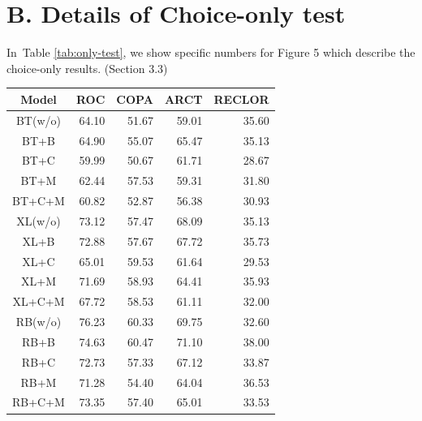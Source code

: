 \documentclass[letterpaper]{article} %
\newcommand{\secref}[1]{Section \ref{#1}}
\newcommand{\tabref}[1]{Table \ref{#1}}
\begin{document}
\section{B.   Details of Choice-only test}
In~\tabref{tab:only-test}, we show specific numbers for Figure 5 which describe 
the choice-only results. (Section 3.3)
\begin{table}[th]
\centering
\scriptsize
\begin{tabular}{c|rrrr}
\toprule
\textbf{Model} & \textbf{ROC} & \textbf{COPA} & \textbf{ARCT} & \textbf{RECLOR} \\ \midrule
BT(w/o)&64.10 &51.67 &59.01 &35.60 \\ \hline  
BT+B&64.90 &55.07 &65.47 &35.13 \\ \hline  
BT+C&59.99 &50.67 &61.71 &28.67 \\ \hline  
BT+M&62.44 &57.53 &59.31 &31.80 \\ \hline  
BT+C+M&60.82 &52.87 &56.38 &30.93 \\ \midrule 
XL(w/o)&73.12 &57.47 &68.09 &35.13 \\ \hline  
XL+B&72.88 &57.67 &67.72 &35.73 \\ \hline  
XL+C&65.01 &59.53 &61.64 &29.53 \\ \hline  
XL+M&71.69 &58.93 &64.41 &35.93 \\ \hline  
XL+C+M&67.72 &58.53 &61.11 &32.00 \\ \midrule 
RB(w/o)&76.23 &60.33 &69.75 &32.60 \\ \hline  
RB+B&74.63 &60.47 &71.10 &38.00 \\ \hline  
RB+C&72.73 &57.33 &67.12 &33.87 \\ \hline  
RB+M&71.28 &54.40 &64.04 &36.53 \\ \hline  
RB+C+M&73.35 &57.40 &65.01 &33.53 \\



\end{tabular}
\end{table}
\end{document}
